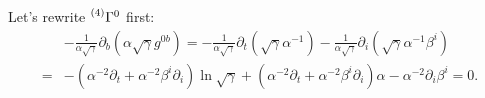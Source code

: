 \documentclass[aps,prd,preprint]{revtex4-1}
\begin{document}
Let's rewrite $\prescript{(4)}{} \Gamma^0$ first:
\begin{align}
  & -\frac{1}{\alpha \sqrt{\gamma}} \partial_b (
    \alpha \sqrt{\gamma} g^{0b} ) =
  - \frac{1}{\alpha \sqrt{\gamma}} \partial_t (
    \sqrt{\gamma} \alpha^{-1} )
  - \frac{1}{\alpha \sqrt{\gamma}} \partial_i (
    \sqrt{\gamma} \alpha^{-1} \beta^i ) \\
  = &
    - \left(
      \alpha^{-2} \partial_t
      + \alpha^{-2} \beta^i \partial_i \right) \ln \sqrt{\gamma}
      + \left( \alpha^{-2} \partial_t
      + \alpha^{-2} \beta^i \partial_i \right) \alpha
    - \alpha^{-2} \partial_i \beta^i = 0.
\end{align}
\end{document}
